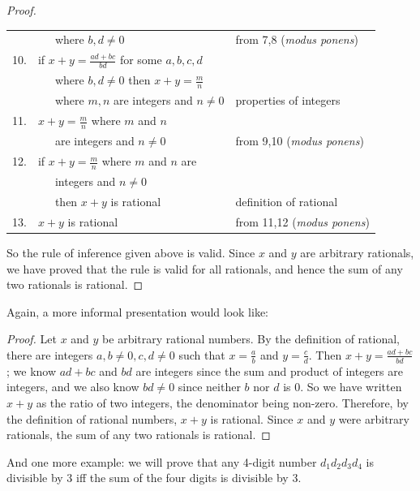 \begin{proof}
\begin{center}
\begin{tabular}{r@{\ \ }l@{\qquad}l}
  & \ \ \ where $b,d \not=0$                                       & from 7,8 (\textit{modus ponens})\\
10.&if $x+y = \frac{ad+bc}{bd}$ for some $a,b,c,d$                 & \\
  & \ \ \  where $b,d \not=0$ then $x+y = \frac{m}{n}$             & \\
  & \ \ \  where $m,n$ are integers and $n\not= 0$                 & properties of integers\\
11.&$x+y = \frac{m}{n}$ where $m$ and $n$                          & \\
   & \ \ \ are integers and $n\not= 0$                             & from 9,10 (\textit{modus ponens})\\
12.&if  $x+y = \frac{m}{n}$ where $m$ and $n$ are                  & \\
   & \ \ \ integers and $n\not= 0$                                 & \\
   & \ \ \ then $x+y$ is rational                                  & definition of rational\\
13.&$x+y$ is rational                                              & from 11,12 (\textit{modus ponens})\\
\end{tabular}
\end{center}
So the rule of inference given above is valid.
Since $x$ and $y$ are arbitrary rationals, we have proved that the rule is valid for all
rationals, and hence the sum of any two rationals is rational.
\end{proof}

Again, a more informal presentation would look like: 
\begin{proof}
Let $x$ and $y$ be arbitrary rational
numbers.  By the definition of rational, there are integers $a,b\not=0,c,d\not=0$ such
that $x=\frac{a}{b}$ and $y=\frac{c}{d}$.  Then $x+y = \frac{ad+bc}{bd}$; we know 
$ad+bc$ and $bd$ are integers since the sum and product of integers are integers, and
we also know $bd\not=0$ since neither $b$ nor $d$ is 0.  So we have written
$x+y$ as the ratio of two integers, the denominator being non-zero.  Therefore, by
the definition of rational numbers, $x+y$ is rational.  Since $x$ and $y$ were arbitrary
rationals, the sum of any two rationals is rational. 
\end{proof}

\medskip

And one more example: we will prove that any 4-digit number $d_1d_2d_3d_4$ is 
divisible by 3 iff the sum of the four digits is divisible by 3.

